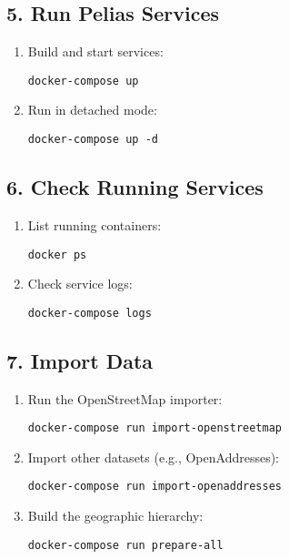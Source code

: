\documentclass{article}
\begin{document}
\subsection*{5. Run Pelias Services}
\begin{enumerate}
    \item Build and start services:
    \begin{lstlisting}
docker-compose up
    \end{lstlisting}
    \item Run in detached mode:
    \begin{lstlisting}
docker-compose up -d
    \end{lstlisting}
\end{enumerate}

\subsection*{6. Check Running Services}
\begin{enumerate}
    \item List running containers:
    \begin{lstlisting}
docker ps
    \end{lstlisting}
    \item Check service logs:
    \begin{lstlisting}
docker-compose logs
    \end{lstlisting}
\end{enumerate}

\subsection*{7. Import Data}
\begin{enumerate}
    \item Run the OpenStreetMap importer:
    \begin{lstlisting}
docker-compose run import-openstreetmap
    \end{lstlisting}
    \item Import other datasets (e.g., OpenAddresses):
    \begin{lstlisting}
docker-compose run import-openaddresses
    \end{lstlisting}
    \item Build the geographic hierarchy:
    \begin{lstlisting}
docker-compose run prepare-all
    \end{lstlisting}
\end{enumerate}
\end{document}
